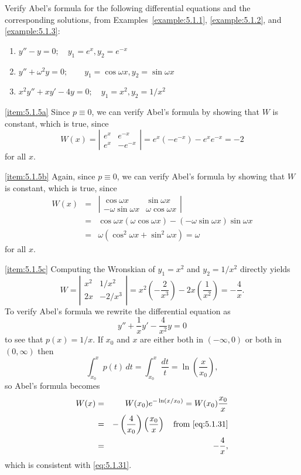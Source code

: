 \documentclass{ximera}
\begin{document}
\begin{example}\label{example:5.1.5}
Verify Abel's formula for the following differential equations and the
corresponding solutions, from  Examples~\ref{example:5.1.1},
\ref{example:5.1.2}, and \ref{example:5.1.3}:
\begin{enumerate}
\item\label{item:5.1.5a} %
$y''-y=0;\quad  y_1=e^x,  y_2=e^{-x}$
\item\label{item:5.1.5b}%
$y''+\omega^2y=0;\quad \quad y_1=\cos\omega x, y_2=\sin\omega x$
\item\label{item:5.1.5c}%
$x^2y''+xy'-4y=0;\quad  y_1=x^2, y_2=1/x^2$
\end{enumerate}
\begin{explanation}
\ref{item:5.1.5a} Since $p\equiv0$, we can verify Abel's formula
by showing that $W$ is constant, which is true, since
$$
W(x)=\left| \begin{array}{rr}
e^x & e^{-x} \\
e^x & -e^{-x}
\end{array} \right|=e^x(-e^{-x})-e^xe^{-x}=-2
$$
for all $x$.
 
\ref{item:5.1.5b} Again, since $p\equiv0$, we can verify Abel's
formula
by showing that $W$ is constant, which is true, since
\begin{eqnarray*}
W(x)&=&\left| \begin{array}{cc}
\cos\omega x & \sin\omega x \\
-\omega\sin\omega x &\omega\cos\omega x
\end{array} \right|\\
&=&\cos\omega x (\omega\cos\omega x)-(-\omega\sin\omega x)\sin\omega
x\\ &=&\omega(\cos^2\omega x+\sin^2\omega x)=\omega
\end{eqnarray*}
for all $x$.
 
\ref{item:5.1.5c}
Computing the Wronskian of $y_1=x^2$ and
$y_2=1/x^2$ directly yields
\begin{equation}\label{eq:5.1.31}
W=\left| \begin{array}{cc}
x^2 & 1/x^2 \\
2x & -2/x^3
\end{array} \right|=x^2\left(-\frac{2}{x^3}\right)-2x\left(\frac{1}{x^2}\right)
=-\frac{4}{x}.
\end{equation}
To verify Abel's formula we
rewrite the differential  equation as
$$
y''+\frac{1}{x}y'-\frac{4}{x^2}y=0
$$
to see  that $p(x)=1/x$. If $x_0$ and $x$ are either both in
$(-\infty,0)$ or both in $(0,\infty)$ then
$$
\int_{x_0}^x p(t)\,dt=\int_{x_0}^x \frac{dt}{t}=\ln\left(\frac{x}{x_0}
\right),
$$
so Abel's formula becomes
\begin{eqnarray*}
W(x)&=&W(x_0)e^{-\ln(x/x_0)}=W(x_0)\frac{x_0}{x}\\
&=&-\left(\frac{4}{x_0}\right)\left(\frac{x_0}{x}\right)\quad\mbox{from
\eqref{eq:5.1.31}}\\
&=&-\frac{4}{x},
\end{eqnarray*}
which is consistent with \eqref{eq:5.1.31}.
\end{explanation}
\end{example}
 
\end{document}
